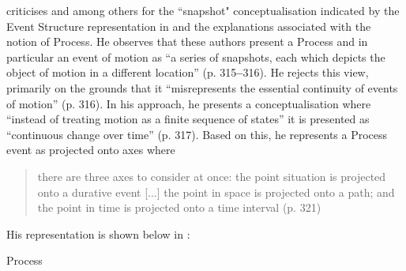 \citet{Jackendoff1996} criticises \citet{Tenny1994} and
\citet{Pustejovsky1991} among others for the ``snapshot"
conceptualisation indicated by the Event Structure representation in
 and the explanations associated with the notion of
Process.  He observes that these authors present a Process and in
particular an event of motion as “a series of snapshots, each which
depicts the object of motion in a different location”
(p. 315\textbf{–}316).  He rejects this view, primarily on the grounds
that it “misrepresents the essential continuity of events of motion”
(p. 316).  In his approach, he presents a conceptualisation where
“instead of treating motion as a finite sequence of states” it is
presented as “continuous change over time” (p. 317).  Based on this,
he represents a Process event as projected onto axes where


\begin{quote}
there are three axes to consider at once: the point situation is
projected onto a durative event [...] the point in space is projected
onto a path; and the point in time is projected onto a time interval
(p. 321)
\end{quote}

His representation is shown below in :

\ea%
\label{ex:4:9}

{ Process}
\begin{center}
\end{center}
\z


